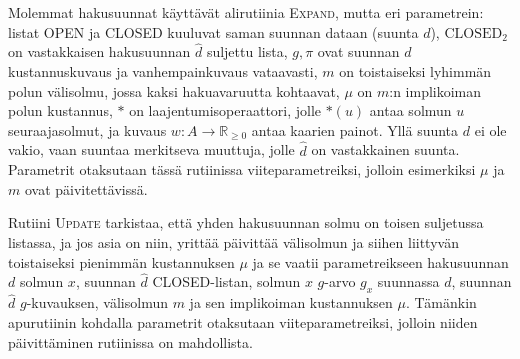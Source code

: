 \documentclass[finnish]{tktltiki2}
\theoremstyle{definition}
\theoremstyle{remark}
\begin{document}
Molemmat hakusuunnat käyttävät alirutiinia \textsc{Expand}, mutta eri parametrein: listat OPEN ja CLOSED kuuluvat saman suunnan dataan (suunta $d$), $\text{CLOSED}_2$ on vastakkaisen hakusuunnan $\hat{d}$ suljettu lista, $g, \pi$ ovat suunnan $d$ kustannuskuvaus ja vanhempainkuvaus vataavasti, $m$ on toistaiseksi lyhimmän polun välisolmu, jossa kaksi hakuavaruutta kohtaavat, $\mu$ on $m$:n implikoiman polun kustannus, $\ast$ on laajentumisoperaattori, jolle $\ast(u)$ antaa solmun $u$ seuraajasolmut, ja kuvaus $w \colon A \to \mathbb{R}_{\geq 0}$ antaa kaarien painot. Yllä suunta $d$ ei ole vakio, vaan suuntaa merkitseva muuttuja, jolle $\hat{d}$ on vastakkainen suunta. Parametrit otaksutaan tässä rutiinissa viiteparametreiksi, jolloin esimerkiksi $\mu$ ja $m$ ovat päivitettävissä. 

Rutiini \textsc{Update} tarkistaa, että yhden hakusuunnan solmu on toisen suljetussa listassa, ja jos asia on niin, yrittää päivittää välisolmun ja siihen liittyvän toistaiseksi pienimmän kustannuksen $\mu$ ja se vaatii parametreikseen hakusuunnan $d$ solmun $x$, suunnan $\hat{d}$ CLOSED-listan, solmun $x$ $g$-arvo $g_x$ suunnassa $d$, suunnan $\hat{d}$ $g$-kuvauksen, välisolmun $m$ ja sen implikoiman kustannuksen $\mu$. Tämänkin apurutiinin kohdalla parametrit otaksutaan viiteparametreiksi, jolloin niiden päivittäminen rutiinissa on mahdollista.
\end{document}
